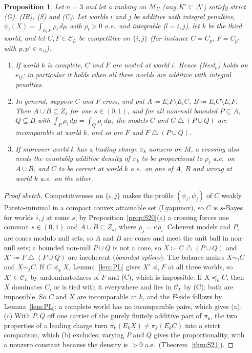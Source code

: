 \documentclass[11pt]{article}
\newtheorem{proposition}[theorem]{Proposition}
\theoremstyle{definition}
\theoremstyle{remark}
\newcommand{\Di}{\Delta^{\circ}}
\newcommand{\M}{\mathcal M}
\newcommand{\C}{\mathcal C}
\newcommand{\sd}{\mathbin{\triangle}}
\begin{document}
\begin{proposition}\label{prop:RS2A}
Let $n=3$ and let a ranking on $\M_U$ (any $K'\subseteq\Di$) satisfy strict (G), (IB), (S) and (C). Let worlds $i$ and $j$ be additive with integral penalties, $\psi_l(X)=\int_{E_lX}\rho_l\,d\mu$ with $\rho_l>0$ a.e.\ and integrable ($l=i,j$), let $k$ be the third world, and let $C,F\in\C_L$ be competitive on $\{i,j\}$ (for instance $C=C_p$, $F=C_{p'}$ with $p,p'\in e_{ij}$).
\begin{enumerate}[leftmargin=*,label=(\alph*)]
\item If world $k$ is complete, $C$ and $F$ are nested at world $i$. Hence (Nest$_e$) holds on $e_{ij}$; in particular it holds when all three worlds are additive with integral penalties.
\item In general, suppose $C$ and $F$ cross, and put $A\coloneqq E_iF\setminus E_iC$, $B\coloneqq E_iC\setminus E_iF$. Then $A\cup B\subseteq Z_s$ for one $s\in(0,1)$, and for all non-null bounded $P\subseteq A$, $Q\subseteq B$ with $\int_P\rho_i\,d\mu=\int_Q\rho_i\,d\mu$, the models $C$ and $C\sd(P\cup Q)$ are incomparable at world $k$, and so are $F$ and $F\sd(P\cup Q)$.
\item If moreover world $k$ has a leading charge $\pi_k$ nonzero on $M$, a crossing also needs the countably additive density of $\pi_k$ to be proportional to $\rho_i$ a.e.\ on $A\cup B$, and $C$ to be correct at world $k$ a.e.\ on one of $A$, $B$ and wrong at world $k$ a.e.\ on the other.
\end{enumerate}
\end{proposition}
\begin{proof}[Proof sketch]
Competitiveness on $\{i,j\}$ makes the profile $(\psi_i,\psi_j)$ of $C$ weakly Pareto-minimal in a compact convex attainable set (Lyapunov), so $C$ is $s$-Bayes for worlds $i,j$ at some $s$; by Proposition~\ref{prop:S20}(a) a crossing forces one common $s\in(0,1)$ and $A\cup B\subseteq Z_s$, where $\rho_j=\kappa\rho_i$. Coherent models and $P_i$ are cones modulo null sets, so $A$ and $B$ are cones and meet the unit ball in non-null sets; a bounded non-null $P\cup Q$ is not a cone, so $X\coloneqq C\sd(P\cup Q)$ and $X'\coloneqq F\sd(P\cup Q)$ are incoherent (\emph{bounded splices}). The balance makes $X\sim_iC$ and $X\sim_jC$. If $C\preceq_kX$, Lemma~\ref{lem:PL} gives $X'\preceq_lF$ at all three worlds, so $X'\in\C_L$ by undominatedness of $F$ and (C), which is impossible. If $X\preceq_kC$, then $X$ dominates $C$, or is tied with it everywhere and lies in $\C_L$ by (C); both are impossible. So $C$ and $X$ are incomparable at $k$, and the $F$-side follows by Lemma~\ref{lem:PL}; a complete world has no incomparable pairs, which gives (a). (c) With $P,Q$ off one carrier of the purely finitely additive part of $\pi_k$, the two properties of a leading charge turn $\pi_k(E_kX)\ne\pi_k(E_kC)$ into a strict comparison, which (b) excludes; varying $P$ and $Q$ gives the proportionality, with a nonzero constant because the density is $>0$ a.e.\ (Theorem~\ref{thm:S21}).
\end{proof}
\end{document}
